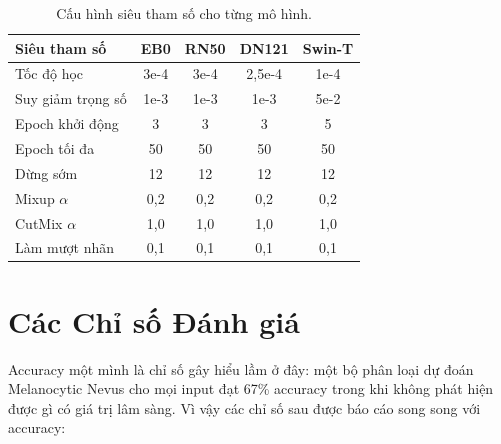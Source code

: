 \begin{table}[H]
\centering
\caption{Cấu hình siêu tham số cho từng mô hình.}
\begin{tabular}{lcccc}
\toprule
\textbf{Siêu tham số} & \textbf{EB0} & \textbf{RN50} & \textbf{DN121} & \textbf{Swin-T} \\
\midrule
Tốc độ học        & 3e-4  & 3e-4  & 2,5e-4 & 1e-4 \\
Suy giảm trọng số & 1e-3  & 1e-3  & 1e-3   & 5e-2 \\
Epoch khởi động   & 3     & 3     & 3      & 5 \\
Epoch tối đa      & 50    & 50    & 50     & 50 \\
Dừng sớm          & 12    & 12    & 12     & 12 \\
Mixup $\alpha$    & 0,2   & 0,2   & 0,2    & 0,2 \\
CutMix $\alpha$   & 1,0   & 1,0   & 1,0    & 1,0 \\
Làm mượt nhãn     & 0,1   & 0,1   & 0,1    & 0,1 \\
\bottomrule
\end{tabular}
\end{table}

\section{Các Chỉ số Đánh giá}

Accuracy một mình là chỉ số gây hiểu lầm ở đây: một bộ phân loại dự đoán Melanocytic Nevus cho mọi input đạt 67\% accuracy trong khi không phát hiện được gì có giá trị lâm sàng. Vì vậy các chỉ số sau được báo cáo song song với accuracy:


